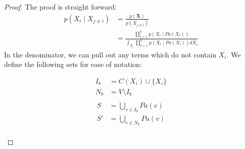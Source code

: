 \begin{proof}
The proof is straight forward:
\begin{equation}\begin{split}
p(X_i \mid X_{j \neq i}) 
	&= \frac{p(\textbf{X})}{p(X_{j \neq i})}\\
	&= \frac{\prod_{l=1}^{k}p(X_l \mid Pa(X_l))}
		{\int_{X_i} \prod_{l=1}^{k}p(X_l \mid Pa(X_l))dX_i}
\end{split}\end{equation}
In the denominator, we can pull out any terms which do not
contain $X_i$. We define the following sets for ease of notation:
\vspace{-1em}
\begin{multicols}{2}
\begin{equation}\begin{split}
I_b &= C(X_i) \cup \{X_i\}\\
N_b &= V \setminus I_b\\
\end{split}\end{equation}\break
\begin{equation}\begin{split}
S &= \bigcup_{v \in I_b} Pa(v) \\
S' &= \bigcup_{v \in N_b} Pa(v) \\
\end{split}\end{equation}
\end{multicols}


\end{proof}
